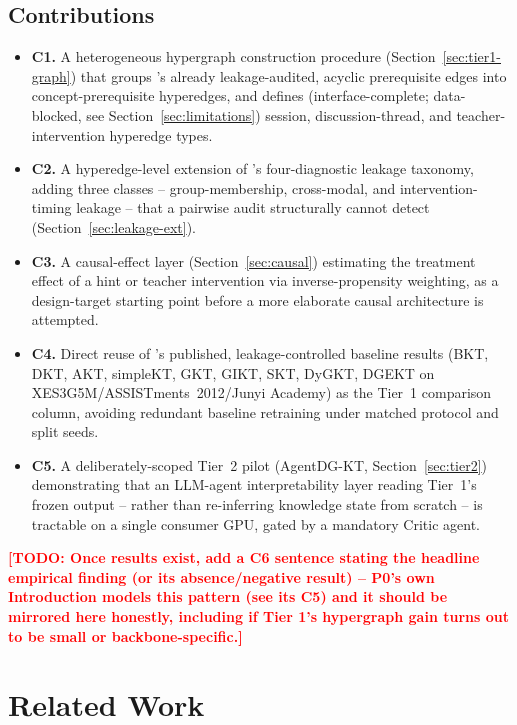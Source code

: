 \documentclass[journal]{IEEEtran}
\newcommand{\todo}[1]{\textcolor{red}{\textbf{[TODO: #1]}}}
\begin{document}
\subsection{Contributions}
\begin{itemize}
  \item \textbf{C1.} A heterogeneous hypergraph construction procedure
  (Section~\ref{sec:tier1-graph}) that groups \cite{daominh2026p0}'s
  already leakage-audited, acyclic prerequisite edges into
  concept-prerequisite hyperedges, and defines (interface-complete;
  data-blocked, see Section~\ref{sec:limitations}) session,
  discussion-thread, and teacher-intervention hyperedge types.
  \item \textbf{C2.} A hyperedge-level extension of \cite{daominh2026p0}'s
  four-diagnostic leakage taxonomy, adding three classes --
  group-membership, cross-modal, and intervention-timing leakage -- that a
  pairwise audit structurally cannot detect (Section~\ref{sec:leakage-ext}).
  \item \textbf{C3.} A causal-effect layer (Section~\ref{sec:causal})
  estimating the treatment effect of a hint or teacher intervention via
  inverse-propensity weighting, as a design-target starting point before a
  more elaborate causal architecture is attempted.
  \item \textbf{C4.} Direct reuse of \cite{daominh2026p0}'s published,
  leakage-controlled baseline results (BKT, DKT, AKT, simpleKT, GKT, GIKT,
  SKT, DyGKT, DGEKT on XES3G5M/ASSISTments~2012/Junyi Academy) as the Tier~1
  comparison column, avoiding redundant baseline retraining under matched
  protocol and split seeds.
  \item \textbf{C5.} A deliberately-scoped Tier~2 pilot (AgentDG-KT,
  Section~\ref{sec:tier2}) demonstrating that an LLM-agent interpretability
  layer reading Tier~1's frozen output -- rather than re-inferring knowledge
  state from scratch -- is tractable on a single consumer GPU, gated by a
  mandatory Critic agent.
\end{itemize}

\todo{Once results exist, add a C6 sentence stating the headline empirical
finding (or its absence/negative result) -- P0's own Introduction models
this pattern (see its C5) and it should be mirrored here honestly, including
if Tier 1's hypergraph gain turns out to be small or backbone-specific.}

\section{Related Work}
\end{document}
